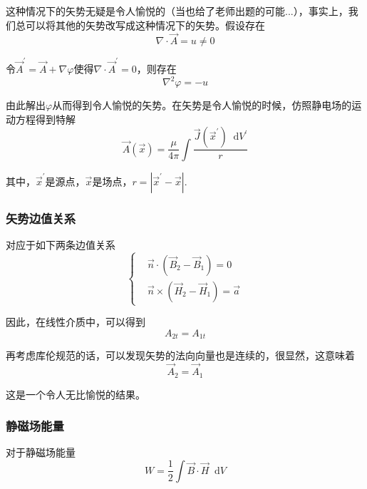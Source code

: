 \documentclass[UTF8]{ctexart}
\newcommand*{\dif}{\mathop{}\!\mathrm{d}}
\begin{document}
    这种情况下的矢势无疑是令人愉悦的（当也给了老师出题的可能...），事实上，我们总可以将其他的矢势改写成这种情况下的矢势。假设存在
    \begin{equation}
        \nabla \cdot \vec{A} = u \ne 0
    \end{equation}

\noindent 令$\vec{A}^{\prime} = \vec{A} + \nabla \varphi$使得$\nabla \cdot \vec{A}^{\prime} = 0$，则存在 
\begin{equation}
    \nabla^2 \varphi = - u
\end{equation}

\noindent 由此解出$\varphi$从而得到令人愉悦的矢势。在矢势是令人愉悦的时候，仿照静电场的运动方程得到特解
\begin{equation}
    \vec{A}(\vec{x}) = \frac{\mu}{4 \pi} \int \frac{\vec{J}(\vec{x}^{\prime}) \dif V^{\prime}}{r}
\end{equation}

\noindent 其中，$\vec{x}^{\prime}$是源点，$\vec{x}$是场点，$r = |\vec{x}^{\prime} - \vec{x}|$.

    \subsubsection{矢势边值关系}
    对应于如下两条边值关系
    \begin{equation}
        \left \{ \begin{aligned}
            &\vec{n} \cdot (\vec{B}_2 - \vec{B}_1) = 0 \\ 
            &\vec{n} \times (\vec{H}_2 - \vec{H}_1) = \vec{a}
        \end{aligned} \right.
    \end{equation}

\noindent 因此，在线性介质中，可以得到
\begin{equation}
    A_{2t} = A_{1t}
\end{equation}

\noindent 再考虑库伦规范的话，可以发现矢势的法向向量也是连续的，很显然，这意味着
\begin{equation}
    \vec{A}_2 =\vec{A}_1
\end{equation}

\noindent 这是一个令人无比愉悦的结果。

    \subsubsection{静磁场能量}
    对于静磁场能量
    \begin{equation}
        W = \frac{1}{2} \int \vec{B} \cdot \vec{H} \dif V
    \end{equation}
\end{document}
